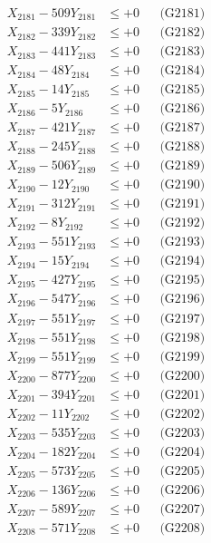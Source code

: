 \documentclass[a4paper,10pt]{article}
\begin{document}
{\begin{align}
\allowbreak
X_{2181} - 509Y_{2181} &\leq +0 && \text{(G2181)} \\
X_{2182} - 339Y_{2182} &\leq +0 && \text{(G2182)} \\
X_{2183} - 441Y_{2183} &\leq +0 && \text{(G2183)} \\
X_{2184} - 48Y_{2184} &\leq +0 && \text{(G2184)} \\
X_{2185} - 14Y_{2185} &\leq +0 && \text{(G2185)} \\
X_{2186} - 5Y_{2186} &\leq +0 && \text{(G2186)} \\
X_{2187} - 421Y_{2187} &\leq +0 && \text{(G2187)} \\
X_{2188} - 245Y_{2188} &\leq +0 && \text{(G2188)} \\
X_{2189} - 506Y_{2189} &\leq +0 && \text{(G2189)} \\
X_{2190} - 12Y_{2190} &\leq +0 && \text{(G2190)} \\
\allowbreak
X_{2191} - 312Y_{2191} &\leq +0 && \text{(G2191)} \\
X_{2192} - 8Y_{2192} &\leq +0 && \text{(G2192)} \\
X_{2193} - 551Y_{2193} &\leq +0 && \text{(G2193)} \\
X_{2194} - 15Y_{2194} &\leq +0 && \text{(G2194)} \\
X_{2195} - 427Y_{2195} &\leq +0 && \text{(G2195)} \\
X_{2196} - 547Y_{2196} &\leq +0 && \text{(G2196)} \\
X_{2197} - 551Y_{2197} &\leq +0 && \text{(G2197)} \\
X_{2198} - 551Y_{2198} &\leq +0 && \text{(G2198)} \\
X_{2199} - 551Y_{2199} &\leq +0 && \text{(G2199)} \\
X_{2200} - 877Y_{2200} &\leq +0 && \text{(G2200)} \\
\allowbreak
X_{2201} - 394Y_{2201} &\leq +0 && \text{(G2201)} \\
X_{2202} - 11Y_{2202} &\leq +0 && \text{(G2202)} \\
X_{2203} - 535Y_{2203} &\leq +0 && \text{(G2203)} \\
X_{2204} - 182Y_{2204} &\leq +0 && \text{(G2204)} \\
X_{2205} - 573Y_{2205} &\leq +0 && \text{(G2205)} \\
X_{2206} - 136Y_{2206} &\leq +0 && \text{(G2206)} \\
X_{2207} - 589Y_{2207} &\leq +0 && \text{(G2207)} \\
X_{2208} - 571Y_{2208} &\leq +0 && \text{(G2208)} \\

\end{align}}
\end{document}
